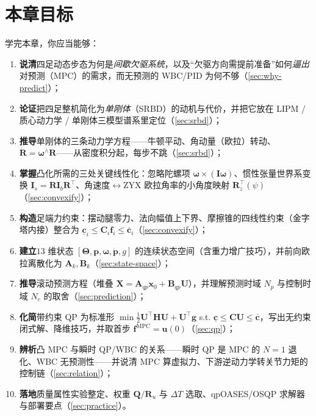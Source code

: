 \section*{本章目标}
学完本章，你应当能够：
\begin{enumerate}
  \item \textbf{说清}四足动态步态为何是\emph{间歇欠驱系统}，以及“欠驱方向需提前准备”如何\emph{逼出}对预测（MPC）的需求，而无预测的 WBC/PID 为何不够（\cref{sec:why-predict}）；
  \item \textbf{论证}把四足整机简化为\emph{单刚体}（SRBD）的动机与代价，并把它放在 LIPM / 质心动力学 / 单刚体三模型谱系里定位（\cref{sec:srbd}）；
  \item \textbf{推导}单刚体的三条动力学方程——牛顿平动、角动量（欧拉）转动、$\dot{\mathbf{R}}=\boldsymbol{\omega}^\wedge\mathbf{R}$——从密度积分起，每步不跳（\cref{sec:srbd}）；
  \item \textbf{掌握}凸化所需的三处关键线性化：忽略陀螺项 $\boldsymbol{\omega}\times(\mathbf{I}\boldsymbol{\omega})$、惯性张量世界系变换 $\mathbf{I}_s=\mathbf{R}\mathbf{I}_b\mathbf{R}^\top$、角速度$\leftrightarrow$ZYX 欧拉角率的小角度映射 $\mathbf{R}_z^\top(\psi)$（\cref{sec:convexify}）；
  \item \textbf{构造}足端力约束：摆动腿零力、法向幅值上下界、摩擦锥的四线性约束（金字塔内接）整合为 $\underline{\mathbf{c}}_i\le\mathbf{C}_i\mathbf{f}_i\le\overline{\mathbf{c}}_i$（\cref{sec:convexify}）；
  \item \textbf{建立}$13$ 维状态 $[\boldsymbol{\Theta},\mathbf{p},\boldsymbol{\omega},\dot{\mathbf{p}},g]$ 的连续状态空间（含重力增广技巧），并前向欧拉离散化为 $\mathbf{A}_k,\mathbf{B}_k$（\cref{sec:state-space}）；
  \item \textbf{推导}滚动预测方程（堆叠 $\mathbf{X}=\mathbf{A}_{qp}\mathbf{x}_0+\mathbf{B}_{qp}\mathbf{U}$），并理解预测时域 $N_p$ 与控制时域 $N_c$ 的取舍（\cref{sec:prediction}）；
  \item \textbf{化简}带约束 QP 为标准形 $\min\tfrac12\mathbf{U}^\top\mathbf{H}\mathbf{U}+\mathbf{U}^\top\mathbf{g}$ s.t. $\underline{\mathbf{c}}\le\mathbf{C}\mathbf{U}\le\overline{\mathbf{c}}$，写出无约束闭式解、降维技巧，并取首步 $\mathbf{f}^{\mathrm{MPC}}=\mathbf{u}(0)$（\cref{sec:qp}）；
  \item \textbf{辨析}凸 MPC 与瞬时 QP/WBC 的关系——瞬时 QP 是 MPC 的 $N=1$ 退化、WBC 无预测性——并说清 MPC 算虚拟力、下游逆动力学转关节力矩的控制链（\cref{sec:relation}）；
  \item \textbf{落地}质量属性实验整定、权重 $\mathbf{Q}/\mathbf{R}_u$ 与 $\Delta T$ 选取、qpOASES/OSQP 求解器与部署要点（\cref{sec:practice}）。
\end{enumerate}

